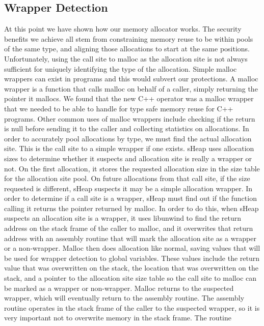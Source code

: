 \documentclass[conference]{IEEEtran}
\begin{document}
\subsection{Wrapper Detection}
At this point we have shown how our memory allocator works. The security benefits 
we achieve all stem from constraining memory reuse to be within pools of the same type, and aligning those allocations to start at the same positions. Unfortunately, 
using the call site to malloc as the allocation site is not always sufficient for 
uniquely identifying the type of the allocation. Simple malloc wrappers can exist 
in programs and this would subvert our protections. A malloc wrapper is a 
function that calls malloc on behalf of a caller, simply returning the pointer it 
mallocs. We found that the new C++ operator was a malloc wrapper that we needed to be able to handle for type safe memory reuse for C++ programs.  Other common uses of malloc wrappers include checking if the return is null 
before sending it to the caller and collecting statistics on allocations. In order to accurately pool allocations by type, we must 
find the actual allocation site. This is the call site to a simple wrapper if one 
exists. sHeap uses allocation sizes to determine whether it suspects and allocation 
site is really a wrapper or not. On the first allocation, it stores the requested 
allocation size in the size table for the allocation site pool. On future 
allocations from that call site, if the size requested is different, sHeap suspects 
it may be a simple allocation wrapper. In order to determine if a call site is a 
wrapper, sHeap must find out if the function calling it returns the pointer returned 
by malloc. In order to do this, when sHeap suspects an allocation site is a wrapper, 
it uses libunwind to find the return address on the stack frame of the caller to 
malloc, and it overwrites that return address with an assembly routine that will mark 
the allocation site as a wrapper or a non-wrapper. Malloc then does allocation like 
normal, saving values that will be used for wrapper detection to global variables. 
These values include the return value that was overwritten on the stack, the location 
that was overwritten on the stack, and a pointer to the allocation site size table so 
the call site to malloc can be marked as a wrapper or non-wrapper. Malloc returns to 
the suspected wrapper, which will eventually return to the assembly routine. The 
assembly routine operates in the stack frame of the caller to the suspected wrapper, 
so it is very important not to overwrite memory in the stack frame. The routine 
\end{document}
